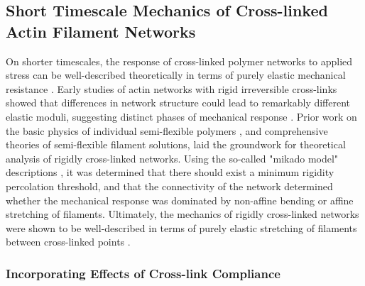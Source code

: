 \subsection{Short Timescale Mechanics of Cross-linked Actin Filament Networks}
\label{sec:semiflex}
On shorter timescales, the response of cross-linked polymer networks to applied stress can be well-described theoretically in terms of purely elastic mechanical resistance \cite{megareview}.   Early studies of actin networks with rigid irreversible cross-links showed that differences in network structure could lead to remarkably different elastic moduli, suggesting distinct phases of mechanical response \cite{rheo_marge}. Prior work on the basic physics of individual semi-flexible polymers \cite{mol_wlc,theo_doi_ed}, and comprehensive theories of semi-flexible filament solutions, \cite{theo_morse} laid the groundwork for theoretical analysis of rigidly cross-linked networks. Using the so-called "mikado model" descriptions \cite{theo_hlm,theo_hlm2}, it was determined that there should exist a minimum rigidity percolation threshold, and that the connectivity of the network determined whether the mechanical response was dominated by non-affine bending or affine stretching of filaments.  Ultimately, the mechanics of rigidly cross-linked networks were shown to be well-described in terms of purely elastic stretching of filaments between cross-linked points \cite{theo_best}.  





\subsubsection{Incorporating Effects of Cross-link Compliance}

